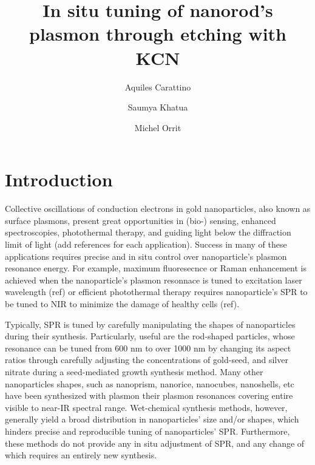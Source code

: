 \documentclass{article}
\title{In situ tuning of nanorod’s plasmon through etching with KCN}
\author{Aquiles Carattino \and Saumya Khatua \and Michel
Orrit}
\begin{document}
\maketitle
{}

\section{Introduction}
Collective oscillations of conduction electrons in gold nanoparticles, also
known as surface plasmons, present great opportunities in (bio-) sensing,
enhanced spectroscopies, photothermal therapy, and guiding light below the
diffraction limit of light (add references for each application). Success in
many of these applications requires precise and in situ control over
nanoparticle’s plasmon resonance energy. For example, maximum fluoresecnce or
Raman enhancement is achieved when the nanoparticle’s plasmon resonnace is tuned
to excitation laser wavelength (ref) or efficient photothermal therapy requires
nanoparticle’s SPR to be tuned to NIR to minimize the damage of healthy cells
(ref). 

Typically, SPR is tuned by carefully manipulating the shapes of nanoparticles
during their synthesis. Particularly, useful are the rod-shaped particles, whose
resonance can be tuned from 600 nm to over 1000 nm by changing its aspect ratios
through carefully adjusting the concentrations of gold-seed, and silver nitrate
during a seed-mediated growth synthesis method. Many other nanoparticles shapes,
such as nanoprism, nanorice, nanocubes, nanoshells, etc have been synthesized
with plasmon their plasmon resonances covering entire visible to near-IR
spectral range. Wet-chemical synthesis methods, however, generally yield a broad
distribution in nanoparticles’ size and/or shapes, which hinders precise and
reproducible tuning of nanoparticles’ SPR.  Furthermore, these methods do not
provide any in situ adjustment of SPR, and any change of which requires an
entirely new synthesis.
\end{document}
